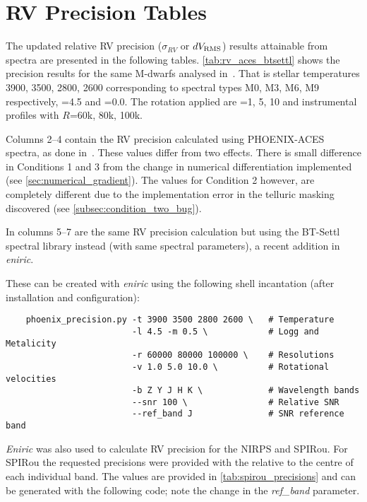 
\chapter{{RV} Precision Tables} %

\label{app:nir_prec_amendment}

The updated relative {RV} precision ($\sigma_{RV}$ or $dV_{\textrm{RMS}}$) results attainable from \nir{} spectra are presented in the following tables.
\cref{tab:rv_aces_btsettl} shows the precision results for the same M-dwarfs analysed in~\citet{figueira_radial_2016}.
That is stellar temperatures 3900, 3500, 2800, 2600\K{} corresponding to spectral types M0, M3, M6, M9 respectively, \Logg{}=4.5 and \feh{}=0.0.
The rotation applied are \Vsini{}=1, 5, 10\kmps{} and instrumental profiles with \(R\)=60k, 80k, 100k.

Columns 2--4 contain the {RV} precision calculated using {PHOENIX-ACES} spectra, as done in~\citet{figueira_radial_2016}.
These values differ from two effects.
There is small difference in Conditions 1 and 3 from the change in numerical differentiation implemented (see \cref{sec:numerical_gradient}).
The values for Condition 2 however, are completely different due to the implementation error in the telluric masking discovered (see \cref{subsec:condition_two_bug}).

In columns 5--7 are the same {RV} precision calculation but using the {BT-Settl} spectral library instead (with same spectral parameters), a recent addition in \emph{eniric}.

These can be created with \emph{eniric} using the following shell incantation (after installation and configuration):
\begin{lstlisting}
    phoenix_precision.py -t 3900 3500 2800 2600 \   # Temperature
                         -l 4.5 -m 0.5 \            # Logg and Metalicity
                         -r 60000 80000 100000 \    # Resolutions
                         -v 1.0 5.0 10.0 \          # Rotational velocities
                         -b Z Y J H K \             # Wavelength bands
                         --snr 100 \                # Relative SNR
                         --ref_band J               # SNR reference band
\end{lstlisting}

\emph{Eniric} was also used to calculate {RV} precision for the {NIRPS} and {SPIRou}.
For {SPIRou} the requested precisions were provided with the \snr{} relative to the centre of each individual band.
The values are provided in \cref{tab:spirou_precisions} and can be generated with the following code; note the change in the \emph{ref\_band} parameter.

